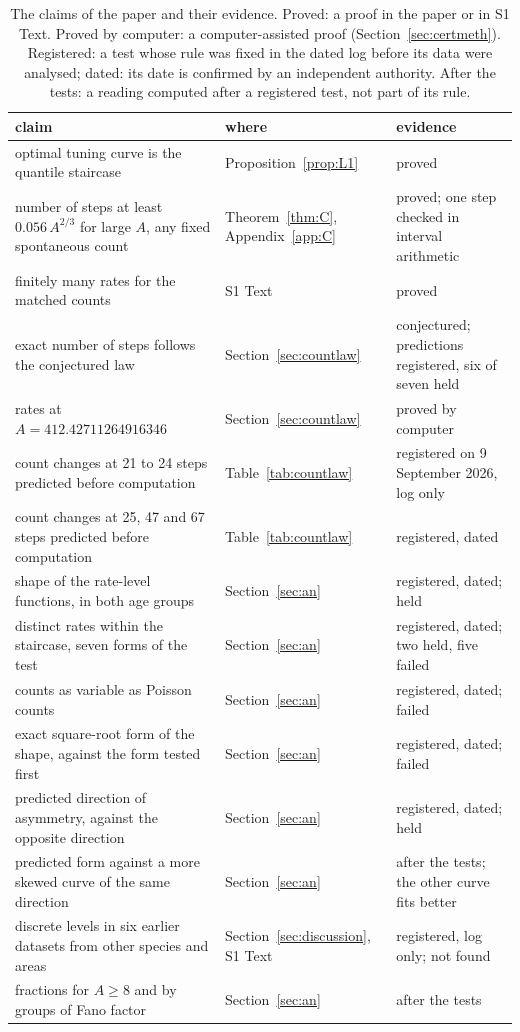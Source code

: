 \documentclass[10pt,letterpaper]{article}
\begin{document}
\begin{table}[tp]
\caption{The claims of the paper and their evidence. Proved: a proof in the paper or in S1 Text. Proved by computer: a computer-assisted
proof (Section~\ref{sec:certmeth}). Registered: a test whose rule was fixed in the dated log before its data were analysed; dated:
its date is confirmed by an independent authority. After the tests: a reading computed after a registered test, not part of its rule.}\label{tab:evidence}
\centering
\small
\begin{tabular}{>{\raggedright\arraybackslash}p{6.2cm}>{\raggedright\arraybackslash}p{3.0cm}>{\raggedright\arraybackslash}p{4.4cm}}
\hline
claim & where & evidence\\
\hline
optimal tuning curve is the quantile staircase & Proposition~\ref{prop:L1} & proved\\
number of steps at least $0.056\,A^{2/3}$ for large $A$, any fixed spontaneous count & Theorem~\ref{thm:C}, Appendix~\ref{app:C} & proved; one step checked
in interval arithmetic\\
finitely many rates for the matched counts & S1 Text & proved\\
exact number of steps follows the conjectured law & Section~\ref{sec:countlaw} & conjectured; predictions registered, six of seven held\\
24 rates at $A=412.42711264916346$ & Section~\ref{sec:countlaw} & proved by computer\\
count changes at 21 to 24 steps predicted before computation & Table~\ref{tab:countlaw} & registered on 9 September 2026, log only\\
count changes at 25, 47 and 67 steps predicted before computation & Table~\ref{tab:countlaw} & registered, dated\\
shape of the rate-level functions, in both age groups & Section~\ref{sec:an} & registered, dated; held\\
distinct rates within the staircase, seven forms of the test & Section~\ref{sec:an} & registered, dated; two held, five failed\\
counts as variable as Poisson counts & Section~\ref{sec:an} & registered, dated; failed\\
exact square-root form of the shape, against the form tested first & Section~\ref{sec:an} & registered, dated; failed\\
predicted direction of asymmetry, against the opposite direction & Section~\ref{sec:an} & registered, dated; held\\
predicted form against a more skewed curve of the same direction & Section~\ref{sec:an} & after the tests; the other curve fits better\\
discrete levels in six earlier datasets from other species and areas & Section~\ref{sec:discussion}, S1 Text & registered, log only; not found\\
fractions for $A\ge8$ and by groups of Fano factor & Section~\ref{sec:an} & after the tests\\
\hline
\end{tabular}
\end{table}
\end{document}
